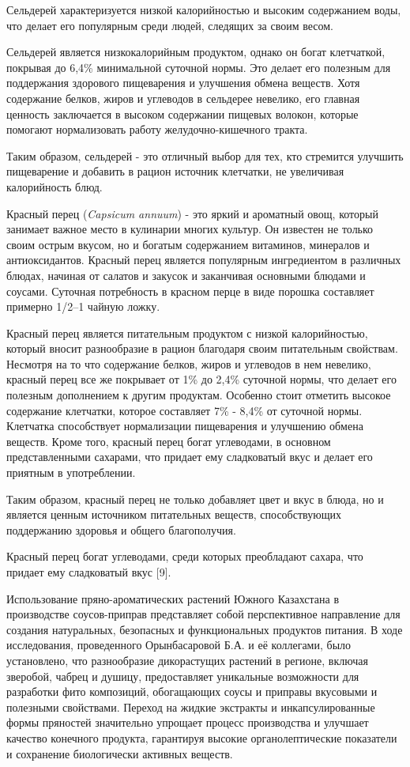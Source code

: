 \begin{multicols}{2}
Сельдерей характеризуется низкой калорийностью и высоким содержанием
воды, что делает его популярным среди людей, следящих за своим весом.

Сельдерей является низкокалорийным продуктом, однако он богат
клетчаткой, покрывая до 6,4\% минимальной суточной нормы. Это делает его
полезным для поддержания здорового пищеварения и улучшения обмена
веществ. Хотя содержание белков, жиров и углеводов в сельдерее невелико,
его главная ценность заключается в высоком содержании пищевых волокон,
которые помогают нормализовать работу желудочно-кишечного тракта.

Таким образом, сельдерей - это отличный выбор для тех, кто стремится
улучшить пищеварение и добавить в рацион источник клетчатки, не
увеличивая калорийность блюд.

Красный перец (\emph{Capsicum annuum}) - это яркий и ароматный овощ,
который занимает важное место в кулинарии многих культур. Он известен не
только своим острым вкусом, но и богатым содержанием витаминов,
минералов и антиоксидантов. Красный перец является популярным
ингредиентом в различных блюдах, начиная от салатов и закусок и
заканчивая основными блюдами и соусами. Суточная потребность в красном
перце в виде порошка составляет примерно 1/2--1 чайную ложку.

Красный перец является питательным продуктом с низкой калорийностью,
который вносит разнообразие в рацион благодаря своим питательным
свойствам. Несмотря на то что содержание белков, жиров и углеводов в нем
невелико, красный перец все же покрывает от 1\% до 2,4\% суточной нормы,
что делает его полезным дополнением к другим продуктам. Особенно стоит
отметить высокое содержание клетчатки, которое составляет 7\% - 8,4\% от
суточной нормы. Клетчатка способствует нормализации пищеварения и
улучшению обмена веществ. Кроме того, красный перец богат углеводами, в
основном представленными сахарами, что придает ему сладковатый вкус и
делает его приятным в употреблении.

Таким образом, красный перец не только добавляет цвет и вкус в блюда, но
и является ценным источником питательных веществ, способствующих
поддержанию здоровья и общего благополучия.

Красный перец богат углеводами, среди которых преобладают сахара, что
придает ему сладковатый вкус {[}9{]}.

Использование пряно-ароматических растений Южного Казахстана в
производстве соусов-приправ представляет собой перспективное направление
для создания натуральных, безопасных и функциональных продуктов питания.
В ходе исследования, проведенного Орынбасаровой Б.А. и её коллегами,
было установлено, что разнообразие дикорастущих растений в регионе,
включая зверобой, чабрец и душицу, предоставляет уникальные возможности
для разработки фито композиций, обогащающих соусы и приправы вкусовыми и
полезными свойствами. Переход на жидкие экстракты и инкапсулированные
формы пряностей значительно упрощает процесс производства и улучшает
качество конечного продукта, гарантируя высокие органолептические
показатели и сохранение биологически активных веществ.


\end{multicols}

